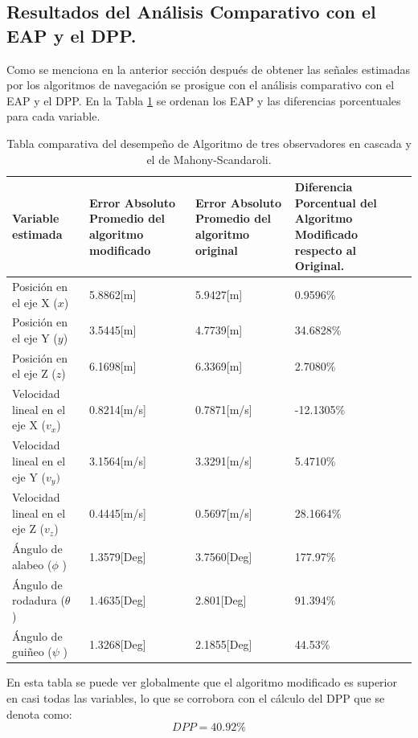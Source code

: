 \documentclass[conference]{IEEEtran}
\begin{document}
\subsection{Resultados del Análisis Comparativo con el EAP y el DPP.}
Como se menciona en la anterior sección después de obtener las señales estimadas por los algoritmos de navegación se prosigue con el análisis comparativo con el EAP y el DPP. En la Tabla \ref{resultados_tb1} se ordenan los EAP y las diferencias porcentuales para cada variable.\par
\begin{table}
\begin{center}
\begin{tabular}{|p{0.6in}|p{0.7in}|p{0.7in}|p{0.7in}|} \hline
\textbf{Variable estimada}&\small\textbf{Error Absoluto Promedio del algoritmo modificado}&\small\textbf{Error Absoluto Promedio del algoritmo original}&\small\textbf{Diferencia Porcentual del Algoritmo Modificado respecto al Original.} \\ \hline
Posición en el eje X ($x$) &5.8862[m]&5.9427[m]&0.9596\%\\ \hline
Posición en el eje Y ($y$) &3.5445[m]&4.7739[m]&34.6828\%\\ \hline
Posición en el eje Z ($z$)&6.1698[m]&6.3369[m]&2.7080\%\\ \hline
Velocidad lineal en el eje X ($v_x$) &0.8214[m/s]&0.7871[m/s]&{-12.1305\%}\\ \hline
Velocidad lineal en el eje Y ($v_y)$&3.1564[m/s]&3.3291[m/s]&5.4710\%\\ \hline
Velocidad lineal en el eje Z ($v_z$)&0.4445[m/s]&0.5697[m/s]&28.1664\%\\ \hline
Ángulo de alabeo ($\phi$ )&1.3579[Deg]&3.7560[Deg]&177.97\%\\ \hline
Ángulo de rodadura ($\theta$ )&1.4635[Deg]&2.801[Deg]&91.394\%\\ \hline
Ángulo de guiñeo ($\psi$ )&1.3268[Deg]&2.1855[Deg]&44.53\%\\ \hline
\end{tabular}
\caption{Tabla comparativa del desempeño de Algoritmo de tres observadores en cascada y el de Mahony-Scandaroli.}
\label{resultados_tb1}
\end{center}
\end{table}
En esta tabla se puede ver globalmente que el algoritmo modificado es superior en casi todas las variables, lo que se corrobora con el cálculo del DPP que se denota como:
\begin{equation}
DPP=40.92\%
\end{equation}
\end{document}
